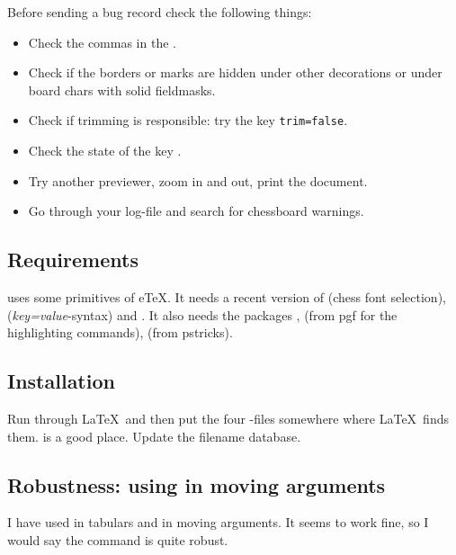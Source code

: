 \documentclass[pagesize,parskip=half-,fontsize=12pt]{scrartcl}
\begin{document}
Before sending a bug record check the following things:


\begin{itemize}
\item  Check the commas in the \keylists.
\end{itemize}

\begin{itemize}
\item Check if the borders or marks are hidden under other decorations or under board chars with solid fieldmasks.
\item Check if trimming is responsible: try the key \verb+trim=false+.
\item Check the state of the key .
\item Try another previewer, zoom in and out, print the document.
\item Go through your log-file and search for chessboard warnings.
\end{itemize}


\subsection{Requirements}

\Pchessboard uses some primitives of e\TeX. It needs a recent version
of \chessfss (chess font selection), 
(\textit{key=value}-syntax) and . It also needs
the packages ,  (from
pgf for the highlighting commands),  (from
pstricks).


\subsection{Installation}
Run  through \LaTeX\ and then put the four
-files somewhere where \LaTeX\ finds them.
 is a good place. Update the
filename database.

\subsection{Robustness: using \texorpdfstring{}{\textbackslash chessboard} in moving arguments}
I have used  in tabulars and in moving arguments. It
seems to work fine, so I would say the command is quite robust.
\end{document}
